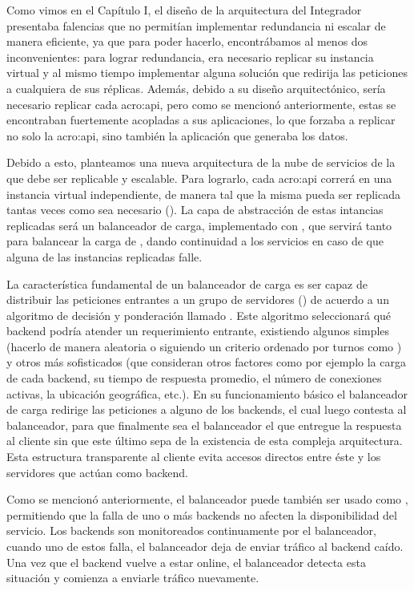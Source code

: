 Como vimos en el Capítulo I, el diseño de la arquitectura del Integrador presentaba falencias que no permitían implementar redundancia ni escalar de manera eficiente, ya que para poder hacerlo, encontrábamos al menos dos inconvenientes: para lograr redundancia, era necesario replicar su instancia virtual y al mismo tiempo implementar alguna solución que redirija las peticiones a cualquiera de sus réplicas.  Además, debido a su diseño arquitectónico, sería necesario replicar cada \gls{acro:api}, pero como se mencionó anteriormente, estas se encontraban fuertemente acopladas a sus aplicaciones, lo que forzaba a replicar no solo la \gls{acro:api}, sino también la aplicación que generaba los datos.

Debido a esto, planteamos una nueva arquitectura de la nube de servicios de la {\unlp} que debe ser replicable y escalable. Para lograrlo, cada \gls{acro:api} correrá en una instancia virtual independiente, de manera tal que la misma pueda ser replicada tantas veces como sea necesario (). La capa de abstracción de estas intancias replicadas será un balanceador de carga, implementado con , que servirá tanto para balancear la carga de , dando continuidad a los servicios en caso de que alguna de las instancias replicadas falle.

La característica fundamental de un balanceador de carga es ser capaz de distribuir las peticiones entrantes a un grupo de servidores () de acuerdo a un algoritmo de decisión y ponderación llamado . Este algoritmo seleccionará qué backend podría atender un requerimiento entrante, existiendo algunos simples (hacerlo de manera aleatoria o siguiendo un criterio ordenado por turnos como ) y otros más sofisticados (que consideran otros factores como por ejemplo la carga de cada backend, su tiempo de respuesta promedio, el número de conexiones activas, la ubicación geográfica, etc.). En su funcionamiento básico el balanceador de carga redirige las peticiones a alguno de los backends, el cual luego contesta al balanceador, para que finalmente sea el balanceador el que entregue la respuesta al cliente sin que este último sepa de la existencia de esta compleja arquitectura. Esta estructura transparente al cliente evita accesos directos entre éste y los servidores que actúan como backend.

Como se mencionó anteriormente, el balanceador puede también ser usado como , permitiendo que la falla de uno o más backends no afecten la disponibilidad del servicio. Los backends son monitoreados continuamente por el balanceador, cuando uno de estos falla, el balanceador deja de enviar tráfico al backend caído. Una vez que el backend vuelve a estar online, el balanceador detecta esta situación y comienza a enviarle tráfico nuevamente.

